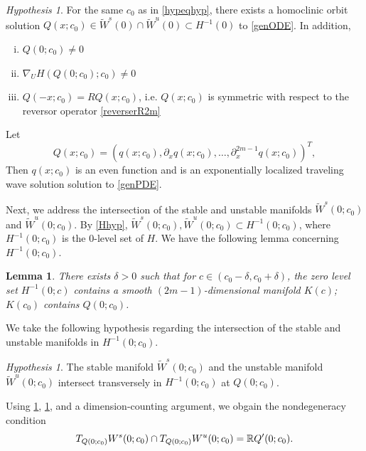 \documentclass[11pt,reqno]{amsart}
\theoremstyle{plain}
\newtheorem{lemma}[theorem]{Lemma}
\theoremstyle{definition}
\theoremstyle{remark}
\newtheorem{hypothesis}[theorem]{Hypothesis}
\begin{document}
\begin{hypothesis}\label{Qexistshyp}
For the same $c_0$ as in \cref{hypeqhyp}, there exists a homoclinic orbit solution $Q(x; c_0) \in \tilde{W}^s(0) \cap \tilde{W}^u(0) \subset H^{-1}(0)$ to \cref{genODE}. In addition,
\begin{enumerate}[(i)]
\item $Q(0; c_0) \neq 0$
\item $\nabla_U H(Q(0; c_0); c_0) \neq 0$
\item $Q(-x; c_0) = R Q(x; c_0)$, i.e. $Q(x; c_0)$ is symmetric with respect to the reversor operator \cref{reverserR2m}
\end{enumerate}
\end{hypothesis}

\noi Let
\begin{equation}\label{Qqrelation}
Q(x; c_0) = (q(x; c_0), \partial_x q(x; c_0), \dots, \partial_x^{2m-1}q(x; c_0))^T,
\end{equation}
Then $q(x; c_0)$ is an even function and is an exponentially localized traveling wave solution solution to \cref{genPDE}. 

Next, we address the intersection of the stable and unstable manifolds $\tilde{W}^s(0; c_0)$ and $\tilde{W}^u(0; c_0)$. By \cref{Hhyp}, $\tilde{W}^s(0; c_0), \tilde{W}^u(0; c_0) \subset H^{-1}(0; c_0)$, where $H^{-1}(0; c_0)$ is the 0-level set of $H$. We have the following lemma concerning $H^{-1}(0; c_0)$.

\begin{lemma}\label{manifoldinH0}
There exists $\delta > 0$ such that for $c \in (c_0 - \delta, c_0 + \delta)$, the zero level set $H^{-1}(0; c)$ contains a smooth $(2m-1)$-dimensional manifold $K(c)$; $K(c_0)$ contains $Q(0; c_0)$.
\end{lemma}

We take the following hypothesis regarding the intersection of the stable and unstable manifolds in $H^{-1}(0; c_0)$.

\begin{hypothesis}\label{H0transversehyp}
The stable manifold $\tilde{W}^s(0; c_0)$ and the unstable manifold $\tilde{W}^u(0; c_0)$ intersect transversely in $H^{-1}(0; c_0)$ at $Q(0; c_0)$.
\end{hypothesis}

\noi Using \cref{H0transversehyp}, \cref{manifoldinH0}, and a dimension-counting argument, we obgain the nondegeneracy condition
\begin{equation}\label{nondegencond}
T_{Q(0; c_0)}W^s(0; c_0) \cap T_{Q(0; c_0)}W^u(0; c_0) = \mathbb{R} Q'(0; c_0).
\end{equation}
\end{document}
